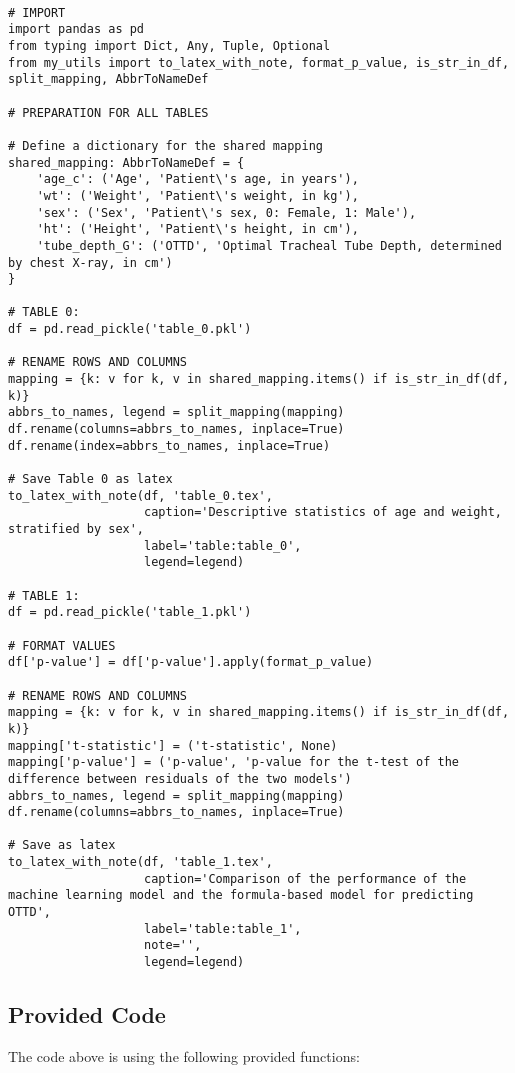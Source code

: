 \documentclass[11pt]{article}
\begin{document}
\begin{verbatim}

# IMPORT
import pandas as pd
from typing import Dict, Any, Tuple, Optional
from my_utils import to_latex_with_note, format_p_value, is_str_in_df, split_mapping, AbbrToNameDef

# PREPARATION FOR ALL TABLES

# Define a dictionary for the shared mapping
shared_mapping: AbbrToNameDef = {
    'age_c': ('Age', 'Patient\'s age, in years'),
    'wt': ('Weight', 'Patient\'s weight, in kg'),
    'sex': ('Sex', 'Patient\'s sex, 0: Female, 1: Male'),
    'ht': ('Height', 'Patient\'s height, in cm'),
    'tube_depth_G': ('OTTD', 'Optimal Tracheal Tube Depth, determined by chest X-ray, in cm')
}

# TABLE 0:
df = pd.read_pickle('table_0.pkl')

# RENAME ROWS AND COLUMNS
mapping = {k: v for k, v in shared_mapping.items() if is_str_in_df(df, k)}
abbrs_to_names, legend = split_mapping(mapping)
df.rename(columns=abbrs_to_names, inplace=True)
df.rename(index=abbrs_to_names, inplace=True)

# Save Table 0 as latex
to_latex_with_note(df, 'table_0.tex', 
                   caption='Descriptive statistics of age and weight, stratified by sex', 
                   label='table:table_0',
                   legend=legend)

# TABLE 1:
df = pd.read_pickle('table_1.pkl')

# FORMAT VALUES
df['p-value'] = df['p-value'].apply(format_p_value)

# RENAME ROWS AND COLUMNS
mapping = {k: v for k, v in shared_mapping.items() if is_str_in_df(df, k)} 
mapping['t-statistic'] = ('t-statistic', None)
mapping['p-value'] = ('p-value', 'p-value for the t-test of the difference between residuals of the two models')
abbrs_to_names, legend = split_mapping(mapping)
df.rename(columns=abbrs_to_names, inplace=True)

# Save as latex
to_latex_with_note(df, 'table_1.tex', 
                   caption='Comparison of the performance of the machine learning model and the formula-based model for predicting OTTD', 
                   label='table:table_1',
                   note='', 
                   legend=legend)

\end{verbatim}

\subsection{Provided Code}
The code above is using the following provided functions:
\end{document}
